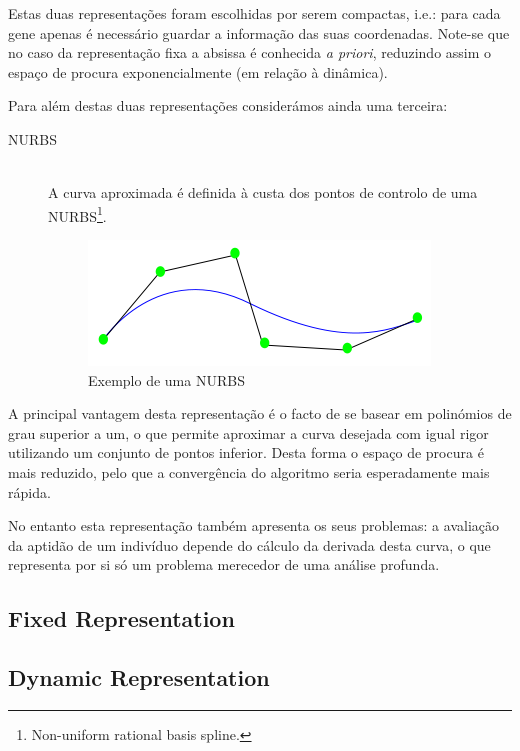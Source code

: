 \documentclass[a4paper]{article}
\begin{document}
\indent Estas duas representações foram escolhidas por serem compactas, i.e.: para cada gene apenas é necessário guardar a informação das suas coordenadas.
Note-se que no caso da representação fixa a absissa é conhecida \emph{a priori}, reduzindo assim o espaço de procura exponencialmente (em relação à dinâmica).

\indent Para além destas duas representações considerámos ainda uma terceira: 

\begin{description}
	\item[NURBS] \hfill \\ 
		A curva aproximada é definida à custa dos pontos de controlo de uma NURBS\footnote[2]{Non-uniform rational basis spline.}. 
		\begin{figure}[ht]
			\centering
			\includegraphics[scale=0.50]{images/NURBstatic.png}
			\caption{Exemplo de uma NURBS}
			\label{fig:nurbs}
		\end{figure}
\end{description}

\indent A principal vantagem desta representação é o facto de se basear em polinómios de grau superior a um, o que permite aproximar a curva desejada
com igual rigor utilizando um conjunto de pontos inferior. Desta forma o espaço de procura é mais reduzido, pelo que a convergência do algoritmo
seria esperadamente mais rápida.

\indent No entanto esta representação também apresenta os seus problemas: a avaliação da aptidão de um indivíduo depende do cálculo da derivada
desta curva, o que representa por si só um problema merecedor de uma análise profunda. 

\cleardoublepage
\subsection{Fixed Representation}

\cleardoublepage

\subsection{Dynamic Representation}
\end{document}
